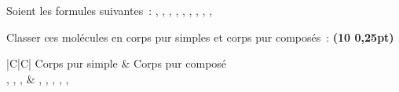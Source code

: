 Soient les formules suivantes~:
, , , , , , , ,
, 

Classer ces molécules en corps pur simples et corps pur composés~:
\textbf{(10 \texttimes{} 0,25pt)} \par
\begin{minipage}{\linewidth}
\begin{table}[H]
    \centering
    \setlength{\arrayrulewidth}{0.8pt}
    \renewcommand{\arraystretch}{1.5}
    \begin{tabularx}{\textwidth}{|C|C|}
        \hline Corps pur simple & Corps pur composé \\
        \hline {}, , ,  &
               , , , , ,   \\ 
        \hline  
    \end{tabularx}
\end{table}
\end{minipage}

